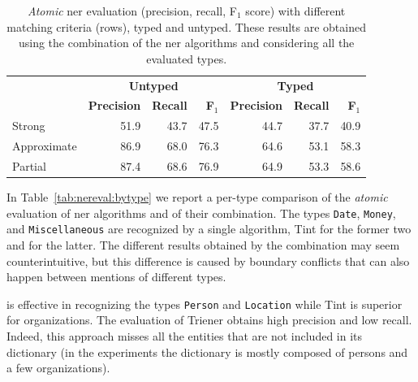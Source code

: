\begin{table}[H]
    \centering
    \begin{tabular}{l|rrr|rrr}
        \toprule
        & \multicolumn{3}{c|}{\textbf{Untyped}} & \multicolumn{3}{c}{\textbf{Typed}} \\
        & \textbf{Precision} & \textbf{Recall} & \textbf{F$_1$} & \textbf{Precision} & \textbf{Recall} & \textbf{F$_1$} \\
        \midrule
        Strong              & 51.9 &	43.7 &	47.5 & 44.7 &	37.7 &	40.9  \\
        Approximate         & 86.9 &	68.0 &	76.3 & 64.6 &	53.1 &	58.3 \\
        Partial             & 87.4 &	68.6 &	76.9 & 64.9 &	53.3 &	58.6 \\ 
        \bottomrule
    \end{tabular}
    \caption{\textit{Atomic} \ac{ner} evaluation (precision, recall, F$_1$ score) with different matching criteria (rows), typed and untyped. These results are obtained using the combination of the \ac{ner} algorithms and considering all the evaluated types.}
    \label{tab:nereval:bymetric}
\end{table}

In Table~\ref{tab:nereval:bytype} we report a per-type comparison of the \textit{atomic} evaluation of \ac{ner} algorithms and of their combination. The types \texttt{Date}, \texttt{Money}, and \texttt{Miscellaneous} are recognized by a single algorithm, Tint for the former two and \spacy for the latter. The different results obtained by the combination may seem counterintuitive, but this difference is caused by boundary conflicts that can also happen between mentions of different types.

\Spacy is effective in recognizing the types \texttt{Person} and \texttt{Location} while Tint is superior for organizations. The evaluation of Trie\ac{ner} obtains high precision and low recall. Indeed, this approach misses all the entities that are not included in its dictionary (in the experiments the dictionary is mostly composed of persons and a few organizations).

